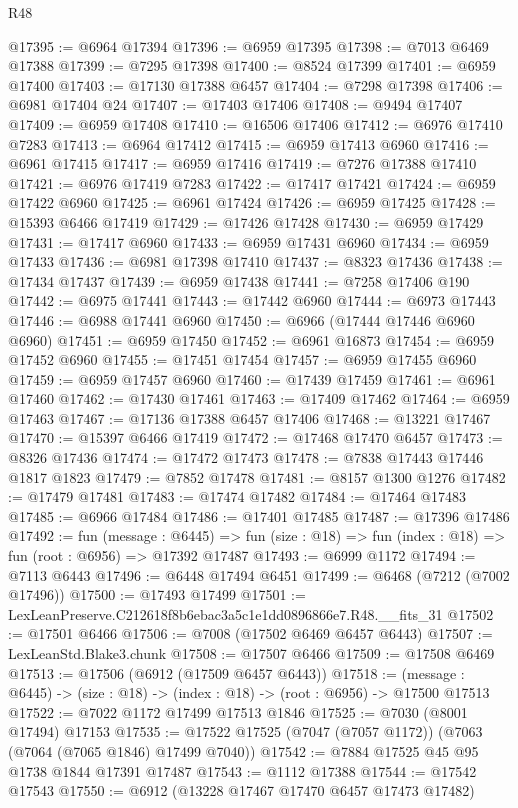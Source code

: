 \begin{lexlean}{R48}
\begin{coremodule}
@17395 := @6964 @17394
@17396 := @6959 @17395
@17398 := @7013 @6469 @17388
@17399 := @7295 @17398
@17400 := @8524 @17399
@17401 := @6959 @17400
@17403 := @17130 @17388 @6457
@17404 := @7298 @17398
@17406 := @6981 @17404 @24
@17407 := @17403 @17406
@17408 := @9494 @17407
@17409 := @6959 @17408
@17410 := @16506 @17406
@17412 := @6976 @17410 @7283
@17413 := @6964 @17412
@17415 := @6959 @17413 @6960
@17416 := @6961 @17415
@17417 := @6959 @17416
@17419 := @7276 @17388 @17410
@17421 := @6976 @17419 @7283
@17422 := @17417 @17421
@17424 := @6959 @17422 @6960
@17425 := @6961 @17424
@17426 := @6959 @17425
@17428 := @15393 @6466 @17419
@17429 := @17426 @17428
@17430 := @6959 @17429
@17431 := @17417 @6960
@17433 := @6959 @17431 @6960
@17434 := @6959 @17433
@17436 := @6981 @17398 @17410
@17437 := @8323 @17436
@17438 := @17434 @17437
@17439 := @6959 @17438
@17441 := @7258 @17406 @190
@17442 := @6975 @17441
@17443 := @17442 @6960
@17444 := @6973 @17443
@17446 := @6988 @17441 @6960
@17450 := @6966 (@17444 @17446 @6960 @6960)
@17451 := @6959 @17450
@17452 := @6961 @16873
@17454 := @6959 @17452 @6960
@17455 := @17451 @17454
@17457 := @6959 @17455 @6960
@17459 := @6959 @17457 @6960
@17460 := @17439 @17459
@17461 := @6961 @17460
@17462 := @17430 @17461
@17463 := @17409 @17462
@17464 := @6959 @17463
@17467 := @17136 @17388 @6457 @17406
@17468 := @13221 @17467
@17470 := @15397 @6466 @17419
@17472 := @17468 @17470 @6457
@17473 := @8326 @17436
@17474 := @17472 @17473
@17478 := @7838 @17443 @17446 @1817 @1823
@17479 := @7852 @17478
@17481 := @8157 @1300 @1276
@17482 := @17479 @17481
@17483 := @17474 @17482
@17484 := @17464 @17483
@17485 := @6966 @17484
@17486 := @17401 @17485
@17487 := @17396 @17486
@17492 := fun (message : @6445) =>
  fun (size : @18) => fun (index : @18) => fun (root : @6956) => @17392 @17487
@17493 := @6999 @1172
@17494 := @7113 @6443
@17496 := @6448 @17494 @6451
@17499 := @6468 (@7212 (@7002 @17496))
@17500 := @17493 @17499
@17501 := LexLeanPreserve.C212618f8b6ebac3a5c1e1dd0896866e7.R48.__fits_31
@17502 := @17501 @6466
@17506 := @7008 (@17502 @6469 @6457 @6443)
@17507 := LexLeanStd.Blake3.chunk
@17508 := @17507 @6466
@17509 := @17508 @6469
@17513 := @17506 (@6912 (@17509 @6457 @6443))
@17518 := (message : @6445) -> (size : @18) -> (index : @18) -> (root : @6956) -> @17500 @17513
@17522 := @7022 @1172 @17499 @17513 @1846
@17525 := @7030 (@8001 @17494) @17153
@17535 := @17522 @17525 (@7047 (@7057 @1172)) (@7063 (@7064 (@7065 @1846) @17499 @7040))
@17542 := @7884 @17525 @45 @95 @1738 @1844 @17391 @17487
@17543 := @1112 @17388
@17544 := @17542 @17543
@17550 := @6912 (@13228 @17467 @17470 @6457 @17473 @17482)

\end{coremodule}
\end{lexlean}

